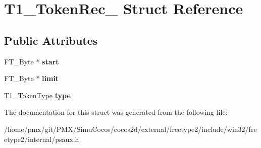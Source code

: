 \hypertarget{structT1__TokenRec__}{}\section{T1\+\_\+\+Token\+Rec\+\_\+ Struct Reference}
\label{structT1__TokenRec__}
\subsection*{Public Attributes}
\begin{DoxyCompactItemize}
\item 
\mbox{\label{structT1__TokenRec___a0287a78845dd3f8270dff7a30ba24b63}} 
F\+T\+\_\+\+Byte $\ast$ {\bfseries start}
\item 
\mbox{\label{structT1__TokenRec___a92ff5f424d157dd7e4c8f5b97fad2ca3}} 
F\+T\+\_\+\+Byte $\ast$ {\bfseries limit}
\item 
\mbox{\label{structT1__TokenRec___a88b3b889e74609be1827ead4093a2d52}} 
T1\+\_\+\+Token\+Type {\bfseries type}
\end{DoxyCompactItemize}


The documentation for this struct was generated from the following file\+:\begin{DoxyCompactItemize}
\item 
/home/pmx/git/\+P\+M\+X/\+Simu\+Cocos/cocos2d/external/freetype2/include/win32/freetype2/internal/psaux.\+h\end{DoxyCompactItemize}
